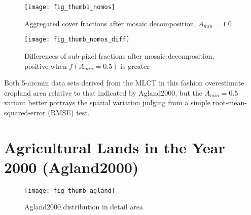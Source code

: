 \begin{figure} 
\begin{center}
  


\texttt{[image: fig\_thumb1\_nomos]}
\end{center} 
\caption{Aggregated cover fractions after mosaic decomposition, $A_{min}=1.0$}
\label{fig:thumb1_nomos}
\end{figure} 

\begin{figure} 
\begin{center}
  

\texttt{[image: fig\_thumb\_nomos\_diff]}
\end{center} 
\caption{Differences of sub-pixel fractions after mosaic
  decomposition, positive when $f(A_{min} = 0.5)$ is greater}
\label{fig:thumb_diff}
\end{figure} 





Both 5-arcmin data sets derived from the MLCT in this fashion
overestimate cropland area relative to that indicated by Agland2000,
but the $A_{min} = 0.5$ variant better portrays the spatial variation
judging from a simple root-mean-squared-error (RMSE)
test. 

\section{Agricultural Lands in the Year 2000 (Agland2000)}
\label{sec:agland2000}

\citet{Ramankutty2008}

  

  

\begin{figure} 
\begin{center}
  

\texttt{[image: fig\_thumb\_agland]}
\end{center} 
\caption{Agland2000 distribution in detail area}
\label{fig:thumb_agland} 
\end{figure} 

